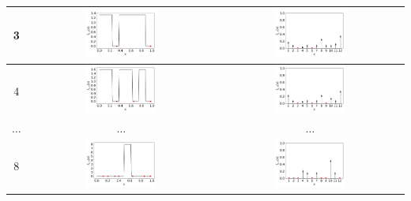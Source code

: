 \documentclass[twoside,11pt]{book}
\numberwithin{theorem}{chapter}
\numberwithin{definition}{chapter}
\numberwithin{proposition}{chapter}
\numberwithin{corollary}{chapter}
\numberwithin{example}{chapter}
\numberwithin{lemma}{chapter}
\numberwithin{assumption}{chapter}
\begin{document}
\begin{table}[]
\begin{tabular}{| c| c| c|}
3 & \includegraphics[width= 0.4\textwidth, height = 0.16\textheight]{img/Haar/haar_Ensemble_1D_conditional_N_2.pdf} & \includegraphics[width= 0.4\textwidth, height = 0.16\textheight]{img/discrete/discrete_Ensemble_1D_conditional_N_2.pdf}\\
\hline
4 & \includegraphics[width= 0.4\textwidth, height = 0.16\textheight]{img/Haar/haar_Ensemble_1D_conditional_N_3.pdf} & \includegraphics[width= 0.4\textwidth, height = 0.16\textheight]{img/discrete/discrete_Ensemble_1D_conditional_N_3.pdf}\\
\hline
$\dots$ &$ \dots$ & $\dots$\\
\hline
8 & \includegraphics[width= 0.4\textwidth, height = 0.16\textheight]{img/Haar/haar_Ensemble_1D_conditional_N_7.pdf} & \includegraphics[width= 0.4\textwidth, height = 0.16\textheight]{img/discrete/discrete_Ensemble_1D_conditional_N_7.pdf}\\

\end{tabular}
\end{table}
\end{document}
